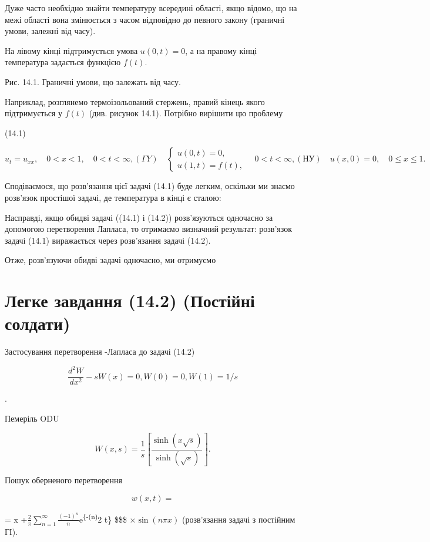 \documentclass[
  ukrainian,
]{article}
\begin{document}
Дуже часто необхідно знайти температуру всередині області, якщо відомо,
що на межі області вона змінюється з часом відповідно до певного закону
(граничні умови, залежні від часу).

На лівому кінці підтримується умова \(u(0,t)=0\), а на правому кінці
температура задається функцією \(f(t)\).

Рис. 14.1. Граничні умови, що залежать від часу.

Наприклад, розглянемо термоізольований стержень, правий кінець якого
підтримується у \(f(t)\) (див. рисунок 14.1). Потрібно вирішити цю
проблему

(14.1)

\[
u_{t} = u_{xx}, \quad 0 < x < 1, \quad 0 < t < \infty,
(\Gamma Y) \quad \begin{cases} u(0, t) = 0, \\ u(1, t) = f(t), \end{cases} \quad 0 < t < \infty,
(\text{НУ}) \quad u(x, 0) = 0, \quad 0 \le x \le 1.
\]

Сподіваємося, що розв'язання цієї задачі (14.1) буде легким, оскільки ми
знаємо розв'язок простішої задачі, де температура в кінці є сталою:

Насправді, якщо обидві задачі ((14.1) і (14.2)) розв'язуються одночасно
за допомогою перетворення Лапласа, то отримаємо визначний результат:
розв'язок задачі (14.1) виражається через розв'язання задачі (14.2).

Отже, розв'язуючи обидві задачі одночасно, ми отримуємо

\section{Легке завдання (14.2) (Постійні
солдати)}\label{ux43bux435ux433ux43aux435-ux437ux430ux432ux434ux430ux43dux43dux44f-14.2-ux43fux43eux441ux442ux456ux439ux43dux456-ux441ux43eux43bux434ux430ux442ux438}

Застосування перетворення -Лапласа до задачі (14.2)

\[
\frac{d^2W}{dx^2} - sW(x) = 0,
W(0) = 0,
W(1) = 1/s
\]

.

Пемеріль ODU

\[
W(x, s) = \frac{1}{s} \left[ \frac{\sinh(x \sqrt{s})}{\sinh(\sqrt{s})} \right].
\]

Пошук оберненого перетворення

\[
w(x, t) =
\]

= x
+\(\frac{2}{\pi} \sum_{n=1}^{\infty} \frac{(-1)^n}{n}\)e\textsuperscript{\{-(n\pi)}2
t\} \times\$\$\$ \(\times \sin(n\pi x)\) (розв'язання задачі з постійним
ГІ).
\end{document}
